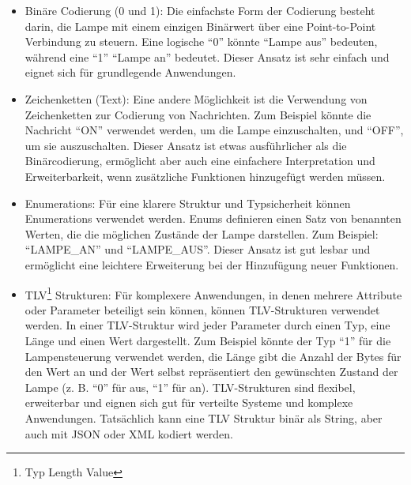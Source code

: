 \documentclass[../vs-script-first-v01.tex]{subfiles}
\begin{document}
\begin{itemize}
\begin{itemize}
\item Binäre Codierung (0 und 1): Die einfachste Form der Codierung besteht darin, die Lampe mit einem einzigen Binärwert über eine Point-to-Point Verbindung zu steuern. Eine logische \enquote{0} könnte \enquote{Lampe aus} bedeuten, während eine \enquote{1} \enquote{Lampe an} bedeutet. Dieser Ansatz ist sehr einfach und eignet sich für grundlegende Anwendungen.
\item Zeichenketten (Text): Eine andere Möglichkeit ist die Verwendung von Zeichenketten zur Codierung von Nachrichten. Zum Beispiel könnte die Nachricht \enquote{ON} verwendet werden, um die Lampe einzuschalten, und \enquote{OFF}, um sie auszuschalten. Dieser Ansatz ist etwas ausführlicher als die Binärcodierung, ermöglicht aber auch eine einfachere Interpretation und Erweiterbarkeit, wenn zusätzliche Funktionen hinzugefügt werden müssen.
\item Enumerations: Für eine klarere Struktur und Typsicherheit können Enumerations verwendet werden. Enums definieren einen Satz von benannten Werten, die die möglichen Zustände der Lampe darstellen. Zum Beispiel: \enquote{LAMPE\_AN} und \enquote{LAMPE\_AUS}. Dieser Ansatz ist gut lesbar und ermöglicht eine leichtere Erweiterung bei der Hinzufügung neuer Funktionen.
\item TLV\footnote{Typ Length Value} Strukturen: Für komplexere Anwendungen, in denen mehrere Attribute oder Parameter beteiligt sein können, können TLV-Strukturen verwendet werden. In einer TLV-Struktur wird jeder Parameter durch einen Typ, eine Länge und einen Wert dargestellt. Zum Beispiel könnte der Typ \enquote{1} für die Lampensteuerung verwendet werden, die Länge gibt die Anzahl der Bytes für den Wert an und der Wert selbst repräsentiert den gewünschten Zustand der Lampe (z. B. \enquote{0} für aus, \enquote{1} für an). TLV-Strukturen sind flexibel, erweiterbar und eignen sich gut für verteilte Systeme und komplexe Anwendungen. Tatsächlich kann eine TLV Struktur binär als String, aber auch mit JSON oder XML kodiert werden.
\end{itemize}


\end{itemize}
\end{document}
